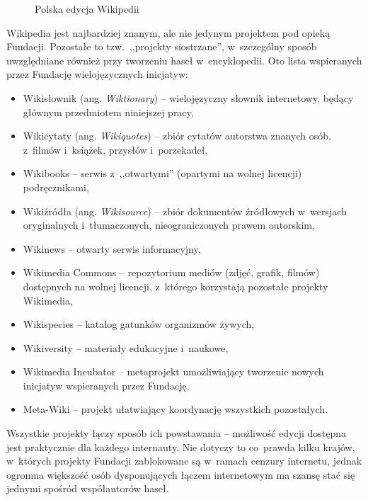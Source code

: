 \documentclass{pracamgr}
\newenvironment{illustration}[0]{
	\begin{figure}[ht]
	\begin{center}
}{
	\end{center}
	\end{figure}
}
\begin{document}
\begin{illustration}
	\caption{Polska edycja Wikipedii}
\end{illustration}

Wikipedia jest najbardziej znanym, ale nie jedynym projektem pod opieką Fundacji. Pozostałe to tzw.\ ,,projekty siostrzane'', w~szczególny sposób uwzględniane również przy tworzeniu haseł w~encyklopedii. Oto lista wspieranych przez Fundację wielojęzycznych inicjatyw:
\begin{itemize}
	\item Wikisłownik (ang. \emph{Wiktionary}) -- wielojęzyczny słownik internetowy, będący głównym przedmiotem niniejszej pracy,
	\item Wikicytaty (ang. \emph{Wikiquotes}) -- zbiór cytatów autorstwa znanych osób, z~filmów i~książek, przysłów i~porzekadeł,
	\item Wikibooks -- serwis z~,,otwartymi'' (opartymi na wolnej licencji) podręcznikami,
	\item Wikiźródła (ang. \emph{Wikisource}) -- zbiór dokumentów źródłowych w~wersjach oryginalnych i~tłumaczonych, nieograniczonych prawem autorskim,
	\item Wikinews -- otwarty serwis informacyjny,
	\item Wikimedia Commons -- repozytorium mediów (zdjęć, grafik, filmów) dostępnych na wolnej licencji, z~którego korzystają pozostałe projekty Wikimedia,
	\item Wikispecies -- katalog gatunków organizmów żywych,
	\item Wikiversity -- materiały edukacyjne i~naukowe,
	\item Wikimedia Incubator -- metaprojekt umożliwiający tworzenie nowych inicjatyw wspieranych przez Fundację.
	\item Meta-Wiki -- projekt ułatwiający koordynację wszystkich pozostałych.
\end{itemize}
Wszystkie projekty łączy sposób ich powstawania -- możliwość edycji dostępna jest praktycznie dla każdego internauty. Nie dotyczy to co~prawda kilku krajów, w~których projekty Fundacji zablokowane są w~ramach cenzury internetu, jednak ogromna większość osób dysponujących łączem internetowym ma szansę stać się jednymi spośród współautorów haseł.
\end{document}
